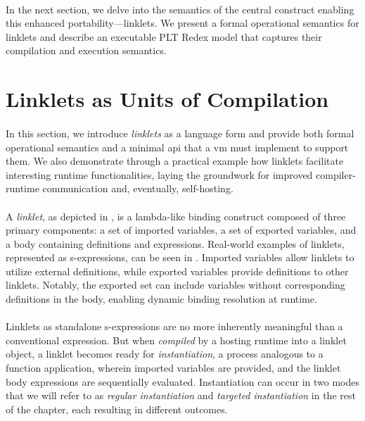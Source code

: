 		\paragraph{}%
			In the next section, we delve into the semantics of the central construct enabling this enhanced portability—linklets. We present a formal operational semantics for linklets and describe an executable PLT Redex model that captures their compilation and execution semantics.

	\section[\texorpdfstring{Linklets as Units of Compilation}{Example Use: REPL}]{Linklets as Units of Compilation}
		\label{section:linklet-semantics}

		\paragraph{}%
			In this section, we introduce \emph{linklets} as a language form and provide both formal operational semantics and a minimal \gls{api} that a \gls{vm} must implement to support them. We also demonstrate through a practical example how linklets facilitate interesting runtime functionalities, laying the groundwork for improved compiler-runtime communication and, eventually, self-hosting.


		\paragraph{}%
			A \emph{linklet}, as depicted in , is a lambda-like binding construct composed of three primary components: a set of imported variables, a set of exported variables, and a body containing definitions and expressions. Real-world examples of linklets, represented as s-expressions, can be seen in . Imported variables allow linklets to utilize external definitions, while exported variables provide definitions to other linklets. Notably, the exported set can include variables without corresponding definitions in the body, enabling dynamic binding resolution at runtime.

		\paragraph{}%
			Linklets as standalone s-expressions are no more inherently meaningful than a conventional  expression. But when \emph{compiled} by a hosting runtime into a linklet object, a linklet becomes ready for \emph{instantiation}, a process analogous to a function application, wherein imported variables are provided, and the linklet body expressions are sequentially evaluated. Instantiation can occur in two modes that we will refer to as \emph{regular instantiation} and \emph{targeted instantiation} in the rest of the chapter, each resulting in different outcomes.

